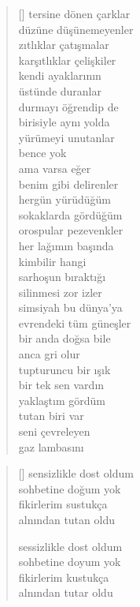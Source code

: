 \documentclass[a5paper, openright, twoside]{memoir}
\begin{document}
\begin{verse}[\versewidth]
  tersine dönen çarklar \\
  düzüne düşünemeyenler \\
  zıtlıklar çatışmalar \\
  karşıtlıklar çelişkiler \\
  kendi ayaklarının \\
  üstünde duranlar \\
  durmayı öğrendip de \\
  birisiyle aynı yolda \\
  yürümeyi unutanlar \\
  bence yok \\
  ama varsa eğer \\
  benim gibi delirenler \\
  hergün yürüdüğüm \\
  sokaklarda gördüğüm \\
  orospular pezevenkler \\
  her lağımın başında \\
  kimbilir hangi \\
  sarhoşun bıraktığı \\
  silinmesi zor izler \\
  simsiyah bu dünya'ya \\
  evrendeki tüm güneşler \\
  bir anda doğsa bile \\
  anca gri olur \\
  tupturuncu bir ışık \\
  bir tek sen vardın \\
  yaklaştım gördüm \\
  tutan biri var \\
  seni çevreleyen \\
  gaz lambasını \\
\end{verse}
\begin{verse}[\versewidth]
  sensizlikle dost oldum \\
  sohbetine doğum yok \\
  fikirlerim sustukça \\
  alnından tutan oldu

  sessizlikle dost oldum \\
  sohbetine doyum yok \\
  fikirlerim kustukça \\
  alnından tutar oldu
\end{verse}
\end{document}
